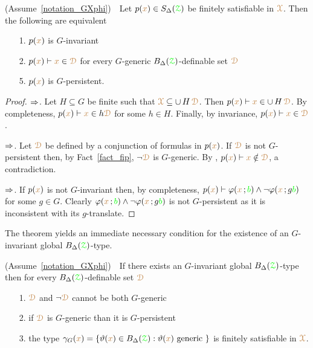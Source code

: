 \begin{theorem}\label{thm_generic_invariant}
  (Assume~\ref{notation_GXphi})\ \  
  Let $p({\color{brown} x})\in S_\Delta({\color{green}\EuScript Z})$ be finitely satisfiable in ${\color{brown}\EuScript X}$.
  Then the following are equivalent
  \begin{itemize}
    \item[1.] $p({\color{brown} x})$ is $G$-invariant
    \item[2.] $p({\color{brown} x})\vdash{\color{brown}x}\in{\color{brown}\EuScript D}$ for every $G$-generic $B_\Delta({{\color{green}\EuScript Z}})$-definable set ${\color{brown}\EuScript D}$
    \item[5.] $p({\color{brown} x})$ is $G$-persistent.
  \end{itemize}
\end{theorem}

\begin{proof}
  $\Rightarrow$.
  Let $H\subseteq G$ be finite such that ${\color{brown}\EuScript X}\subseteq\cup\,H\,{\color{brown}\EuScript D}$.
  Then $p({\color{brown} x})\vdash {\color{brown}x}\in\cup\,H\,{\color{brown}\EuScript D}$.
  By completeness, $p({\color{brown} x})\vdash {\color{brown}x}\in h{\color{brown}\EuScript D}$ for some $h\in H$.
  Finally, by invariance,  $p({\color{brown} x})\vdash{\color{brown}x}\in{\color{brown}\EuScript D}$.
  
  $\Rightarrow$.
  Let ${\color{brown}\EuScript D}$ be defined by a conjunction of formulas in $p({\color{brown} x})$.
  If ${\color{brown}\EuScript D}$ is not $G$-persistent then, by Fact~\ref{fact_fip}, $\neg{\color{brown}\EuScript D}$ is $G$-generic. 
  By \ssf2, $p({\color{brown} x})\vdash{\color{brown}x}\notin{\color{brown}\EuScript D}$, a contradiction.

  $\Rightarrow$.
  If $p({\color{brown} x})$ is not $G$-invariant then, by completeness, $p({\color{brown} x})\vdash\varphi({\color{brown} x}\,;{\color{green} b})\wedge\neg\varphi({\color{brown} x}\,;g{\color{green} b})$ for some $g\in G$.
  Clearly $\varphi({\color{brown} x}\,;{\color{green} b})\wedge\neg\varphi({\color{brown} x}\,;g{\color{green} b})$ is not $G$-persistent as it is inconsistent with its $g$-translate.
\end{proof}

The theorem yields an immediate necessary condition for the existence of an $G$-invariant global $B_\Delta({{\color{green}\EuScript Z}})$-type.

\begin{corollary}\label{corol_def_mu}
  (Assume~\ref{notation_GXphi})\ \  
  If there exists an $G$-invariant global $B_\Delta({{\color{green}\EuScript Z}})$-type then for every $B_\Delta({{\color{green}\EuScript Z}})$-definable set ${\color{brown}\EuScript D}$
  \begin{itemize}
    \item[1.] ${\color{brown}\EuScript D}$ and $\neg{\color{brown}\EuScript D}$ cannot be both $G$-generic
    \item[2.] if ${\color{brown}\EuScript D}$ is $G$-generic than it is $G$-persistent
    \item[3.] the type $\gamma_G({\color{brown} x})=\{\vartheta({\color{brown} x})\in B_\Delta({{\color{green}\EuScript Z}}): \vartheta({\color{brown} x})\textrm{ generic }\}$ is finitely satisfiable in ${\color{brown}\EuScript X}$.
  \end{itemize}
\end{corollary}

